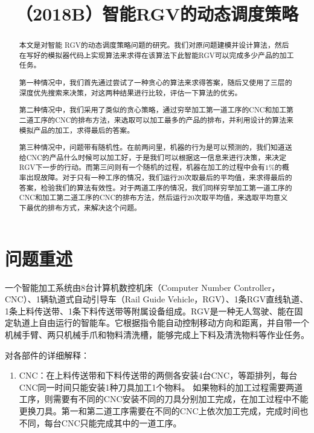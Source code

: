 \documentclass{cumcmthesis}
\title{（2018B）智能RGV的动态调度策略}
\begin{document}
\maketitle
\begin{abstract}

本文是对智能 RGV的动态调度策略问题的研究。我们对原问题建模并设计算法，然后在写好的模拟器代码上实现算法来求得在该算法下此智能RGV可以完成多少产品的加工任务。

第一种情况中，我们首先通过尝试了一种贪心的算法来求得答案，随后又使用了三层的深度优先搜索来决策，对这两种结果进行比较，评估一下算法的优劣。

第二种情况中，我们采用了类似的贪心策略，通过穷举加工第一道工序的CNC和加工第二道工序的CNC的排布方法，来选取可以加工最多的产品的排布，并利用设计的算法来模拟产品的加工，求得最后的答案。

第三种情况中，问题带有随机性。在前两问里，机器的行为是可以预测的，我们知道送给CNC的产品什么时候可以加工好，于是我们可以根据这一信息来进行决策，来决定RGV下一步的行动。而第三问则有一个随机的过程，机器在加工的过程中会有$1\%$的概率出现故障。对于只有一种工序的情况，我们运行20次取最后的平均值，来求得最后的答案，检验我们的算法有效性。对于两道工序的情况，我们同样穷举加工第一道工序的CNC和加工第二道工序的CNC的排布方法，然后运行20次取平均值，来选取平均意义下最优的排布方式，来解决这个问题。

\end{abstract}

\tableofcontents

\section{问题重述}

一个智能加工系统由8台计算机数控机床（Computer Number Controller，CNC）、1辆轨道式自动引导车（Rail Guide Vehicle，RGV）、1条RGV直线轨道、1条上料传送带、1条下料传送带等附属设备组成。RGV是一种无人驾驶、能在固定轨道上自由运行的智能车。它根据指令能自动控制移动方向和距离，并自带一个机械手臂、两只机械手爪和物料清洗槽，能够完成上下料及清洗物料等作业任务。

对各部件的详细解释：

\begin{enumerate}[（1）]
	\item CNC：在上料传送带和下料传送带的两侧各安装4台CNC，等距排列，每台CNC同一时间只能安装1种刀具加工1个物料。
	如果物料的加工过程需要两道工序，则需要有不同的CNC安装不同的刀具分别加工完成，在加工过程中不能更换刀具。第一和第二道工序需要在不同的CNC上依次加工完成，完成时间也不同，每台CNC只能完成其中的一道工序。
\end{enumerate}
\end{document}
